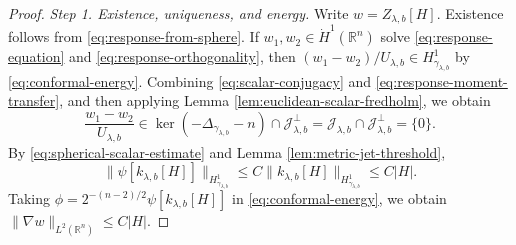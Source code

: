 \documentclass[11pt]{article}
\numberwithin{equation}{section}
\theoremstyle{remark}
\newcommand{\R}{\mathbb R}
\begin{document}
\par
\begin{proof}
\emph{Step 1. Existence, uniqueness, and energy.}
Write \(w=Z_{\lambda,b}[H]\). Existence follows from
\eqref{eq:response-from-sphere}.
If \(w_1,w_2\in\dot H^1(\R^n)\) solve
\eqref{eq:response-equation}  and  \eqref{eq:response-orthogonality}, then
\((w_1-w_2)/U_{\lambda,b}\in H^1_{\gamma_{\lambda,b}}\) by
\eqref{eq:conformal-energy}.
{Combining \eqref{eq:scalar-conjugacy} and
\eqref{eq:response-moment-transfer}, and then applying
Lemma  \ref{lem:euclidean-scalar-fredholm}, we obtain}
 {
\[
 \frac{w_1-w_2}{U_{\lambda,b}}
 \in\ker(-\Delta_{\gamma_{\lambda,b}}-n)
       \cap\mathcal J_{\lambda,b}^{\perp}
 =\mathcal J_{\lambda,b}\cap\mathcal J_{\lambda,b}^{\perp}
 =\{0\}.
\]
}
By \eqref{eq:spherical-scalar-estimate} and
Lemma  \ref{lem:metric-jet-threshold},
\[
 \|\psi[k_{\lambda,b}[H]]\|_{H^1_{\gamma_{\lambda,b}}}
 \le C\|k_{\lambda,b}[H]\|_{H^1_{\gamma_{\lambda,b}}}
 \le C|H|.
\]
Taking
\(\phi=2^{-(n-2)/2}\psi[k_{\lambda,b}[H]]\) in
\eqref{eq:conformal-energy}, we obtain \(\|\nabla w\|_{L^2(\R^n)}\le C|H|\).


\end{proof}
\end{document}
